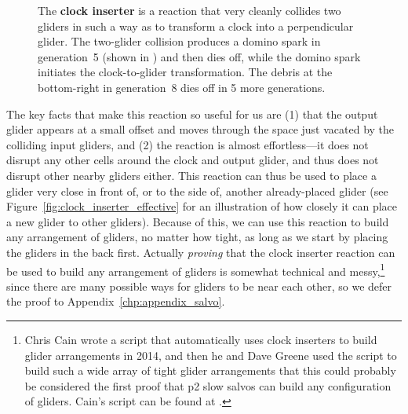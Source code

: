 \begin{figure}[!htb]
	\centering
	\caption{The \textbf{clock inserter} is a reaction that very cleanly collides two gliders in such a way as to transform a clock into a perpendicular glider. The two-glider collision produces a domino spark in generation~5 (shown in ) and then dies off, while the domino spark initiates the clock-to-glider transformation. The debris at the bottom-right in generation~8 dies off in 5 more generations.}\label{fig:clock_inserter}
\end{figure}

The key facts that make this reaction so useful for us are (1) that the output glider appears at a small offset and moves through the space just vacated by the colliding input gliders, and (2) the reaction is almost effortless---it does not disrupt any other cells around the clock and output glider, and thus does not disrupt other nearby gliders either. This reaction can thus be used to place a glider very close in front of, or to the side of, another already-placed glider (see Figure~\ref{fig:clock_inserter_effective} for an illustration of how closely it can place a new glider to other gliders). Because of this, we can use this reaction to build any arrangement of gliders, no matter how tight, as long as we start by placing the gliders in the back first. Actually \emph{proving} that the clock inserter reaction can be used to build any arrangement of gliders is somewhat technical and messy,\footnote{Chris Cain wrote a script that automatically uses clock inserters to build glider arrangements in 2014, and then he and Dave Greene used the script to build such a wide array of tight glider arrangements that this could probably be considered the first proof that p2 slow salvos can build any configuration of gliders. Cain's script can be found at .} since there are many possible ways for gliders to be near each other, so we defer the proof to Appendix~\ref{chp:appendix_salvo}.

